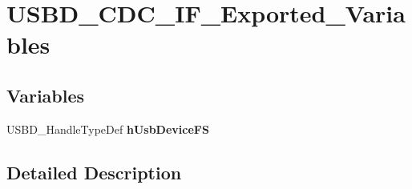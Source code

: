 \hypertarget{group___u_s_b_d___c_d_c___i_f___exported___variables}{}\section{U\+S\+B\+D\+\_\+\+C\+D\+C\+\_\+\+I\+F\+\_\+\+Exported\+\_\+\+Variables}
\label{group___u_s_b_d___c_d_c___i_f___exported___variables}
\subsection*{Variables}
\begin{DoxyCompactItemize}
\item 
\hypertarget{group___u_s_b_d___c_d_c___i_f___exported___variables_gafe8a2d9e10b33d5e7906f9f04f95358e}{}\label{group___u_s_b_d___c_d_c___i_f___exported___variables_gafe8a2d9e10b33d5e7906f9f04f95358e} 
U\+S\+B\+D\+\_\+\+Handle\+Type\+Def {\bfseries h\+Usb\+Device\+FS}
\end{DoxyCompactItemize}


\subsection{Detailed Description}
